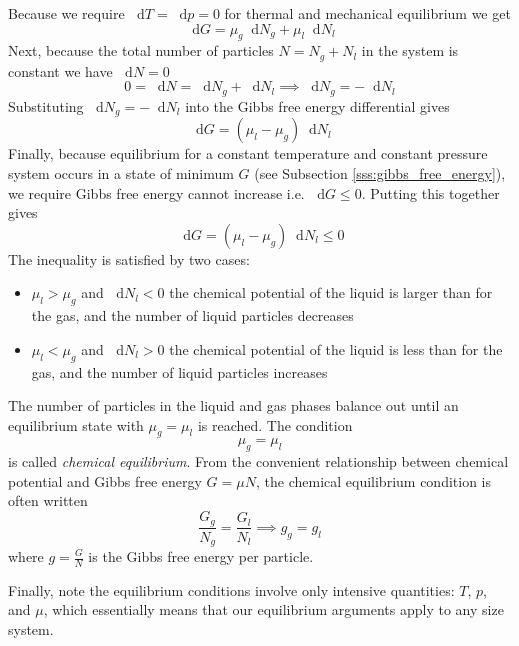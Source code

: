 \documentclass[11pt, a4paper]{article}
\newcommand{\diff}{\mathop{}\!\mathrm{d}} %
\begin{document}
\begin{itemize}
	Because we require $ \diff T = \diff p = 0 $ for thermal and mechanical equilibrium we get
	\begin{equation*}
		\diff G = \mu_{g}\diff N_{g} + \mu_{l} \diff N_{l}
	\end{equation*}
	Next, because the total number of particles $ N = N_{g} + N_{l} $ in the system is constant we have $ \diff N = 0$
	\begin{equation*}
		0 = \diff N = \diff N_{g} + \diff N_{l} \implies \diff N_{g} = -\diff N_{l}
	\end{equation*}
	Substituting $ \diff N_{g} = -\diff N_{l} $ into the Gibbs free energy differential gives
	\begin{equation*}
		\diff G = (\mu_{l} - \mu_{g})\diff N_{l}
	\end{equation*}
	Finally, because equilibrium for a constant temperature and constant pressure system occurs in a state of minimum $ G $  (see Subsection \ref{sss:gibbs_free_energy}), we require Gibbs free energy cannot increase i.e. $ \diff G \leq 0 $. Putting this together gives
	\begin{equation*}
		\diff G = (\mu_{l} - \mu_{g})\diff N_{l} \leq 0
	\end{equation*}
	The inequality is satisfied by two cases:
	\begin{itemize}
		\item $ \mu_{l} > \mu_{g} $ and $ \diff N_{l} < 0$ the chemical potential of the liquid is larger than for the gas, and the number of liquid particles decreases
		\item $ \mu_{l} < \mu_{g} $ and $ \diff N_{l} > 0$ the chemical potential of the liquid is less than for the gas, and the number of liquid particles increases
	\end{itemize}
	The number of particles in the liquid and gas phases balance out until an equilibrium state with $ \mu_{g} = \mu_{l} $ is reached. The condition
	\begin{equation*}
		\mu_{g} = \mu_{l}
	\end{equation*}
	is called \textit{chemical equilibrium}. From the convenient relationship between chemical potential and Gibbs free energy $ G = \mu N $, the chemical equilibrium condition is often written
	\begin{equation*}
		\frac{G_{g}}{N_{g}} = \frac{G_{l}}{N_{l}} \implies g_{g} = g_{l}
	\end{equation*}
	where $ g = \frac{G}{N} $ is the Gibbs free energy per particle.
		
	Finally, note the equilibrium conditions involve only intensive quantities: $ T $, $ p $, and $ \mu $, which essentially means that our equilibrium arguments apply to any size system.
		

\end{itemize}
\end{document}
